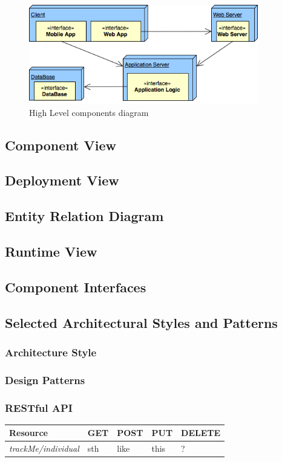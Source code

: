 \documentclass[a4paper]{article}
\begin{document}
\begin{figure}[!htpb]
    	\centering
    	\includegraphics[width=100mm,keepaspectratio]{images/highlevel2.png}
    	\caption{High Level components diagram}
\end{figure}

\subsection{Component View}

\subsection{Deployment View}

\subsection{Entity Relation Diagram}

\subsection{Runtime View}

\subsection{Component Interfaces}

\subsection{Selected Architectural Styles and Patterns}
    \subsubsection{Architecture Style}
    \subsubsection{Design Patterns}
    \subsubsection{RESTful API}
    \begin{table}[!htpb]
        \begin{tabular}{|p{3cm}|p{1.8cm}|p{1.8cm}|p{1.8cm}|p{1.8cm}|} 
         \hline
         \textbf{Resource} & \textbf{GET} & \textbf{POST} & \textbf{PUT} & \textbf{DELETE} \\
         \hline
         \textit{trackMe/individual} & sth &like & this & ? \\
         \hline
        \end{tabular}
    \end{table}
\end{document}
